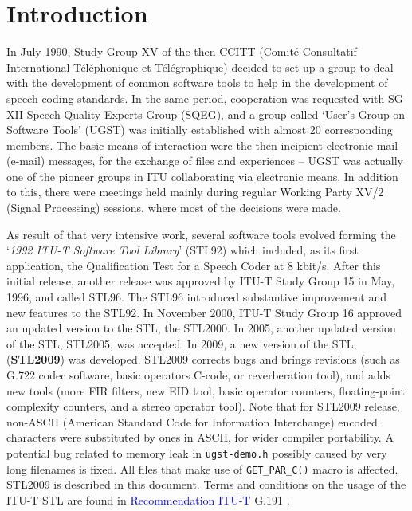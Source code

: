 

\chapter{Introduction}

In July 1990, Study Group XV of the then CCITT (Comit\'e Consultatif
International T\'el\'ephonique et T\'el\'egraphique) decided to set up
a group to deal with the development of common software tools to help
in the development of speech coding standards. In the same period,
cooperation was requested with SG XII Speech Quality Experts Group
(SQEG), and a group called `{U}ser's Group on Software Tools' (UGST)
was initially established with almost 20 corresponding members. The
basic means of interaction were the then incipient electronic mail
(e-mail) messages, for the exchange of files and experiences -- UGST
was actually one of the pioneer groups in ITU collaborating via
electronic means. In addition to this, there were meetings held mainly
during regular Working Party XV/2 (Signal Processing) sessions, where
most of the decisions were made.

As result of that very intensive work, several software tools evolved
forming the `{\em 1992 ITU-T Software Tool Library}' (STL92) which
included, as its first application, the Qualification Test for a
Speech Coder at 8 kbit/s. After this initial release, another release
was approved by ITU-T Study Group 15 in May, 1996, and called
STL96. The STL96 introduced substantive improvement and new features
to the STL92. In November 2000, ITU-T Study Group 16 approved an
updated version to the STL, the STL2000. In 2005, another updated
version of the STL, STL2005, was accepted.  In 2009, a new version of
the STL, ({\bf STL2009}) was developed. STL2009 corrects bugs and
brings revisions (such as G.722 codec software, basic operators
C-code, or reverberation tool), and adds new tools (more FIR filters,
new EID tool, basic operator counters, floating-point complexity
counters, and a stereo operator tool). Note that for STL2009 release,
non-ASCII (American Standard Code for Information Interchange) encoded
characters were substituted by ones in ASCII, for wider compiler
portability. A potential bug related to memory leak in
\texttt{ugst-demo.h} possibly caused by very long filenames is
fixed. All files that make use of \texttt{GET\_PAR\_C()} macro is
affected. STL2009 is described in this document. Terms and
conditions on the usage of the ITU-T STL are found in
\textcolor{blue}{Recommendation ITU-T} G.191 \cite{G.191}.

